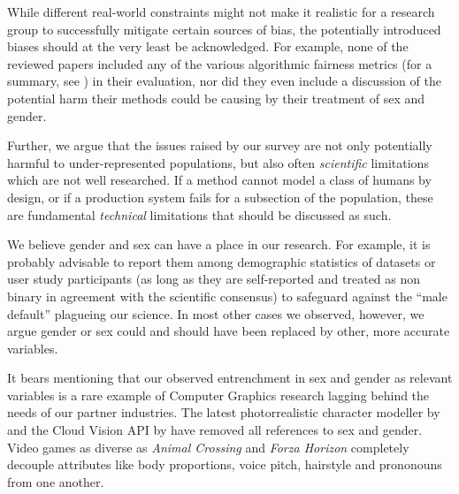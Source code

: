 \documentclass[nonacm,sigconf,review,balance=false]{acmart}
\begin{document}
While different real-world constraints might not make it realistic for a research group to successfully mitigate certain sources of bias, the potentially introduced biases should at the very least be acknowledged. For example, none of the reviewed papers included any of the various algorithmic fairness metrics (for a summary, see \cite{fairnesssurvey, fairnessmetrics}) in their evaluation, nor did they even include a discussion of the potential harm their methods could be causing by their treatment of sex and gender.

Further, we argue that the issues raised by our survey are not only potentially harmful to under-represented populations, but also often \emph{scientific} limitations which are not well researched. If a method cannot model a class of humans by design, or if a production system fails for a subsection of the population, these are fundamental \emph{technical} limitations that should be discussed as such.

We believe gender and sex can have a place in our research. For example, it is probably advisable to report them among demographic statistics of datasets or user study participants (as long as they are self-reported and treated as non binary in agreement with the scientific consensus) to
safeguard against the “male default” plagueing our science. In most other cases we observed, however, we argue gender or sex could and should have been replaced by other, more accurate variables.

It bears mentioning that our observed entrenchment in sex and gender as relevant variables is a rare example of Computer Graphics research
lagging behind the needs of our partner industries. The latest
photorrealistic character modeller by \citet{metahuman} and the Cloud Vision API by \citet{googlegender} have removed all references to sex and gender. Video games as diverse as \emph{Animal Crossing} and \emph{Forza Horizon} completely decouple attributes like body proportions, voice pitch, hairstyle and prononouns from one another.
\end{document}
